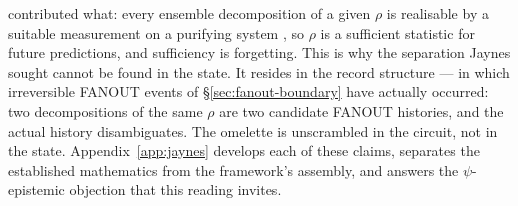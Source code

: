 contributed what: every ensemble decomposition of a given $\rho$ is
realisable by a suitable measurement on a purifying system
\autocite{schrodinger1936probability,hughston1993ensemble}, so $\rho$
is a sufficient statistic for future predictions, and sufficiency is
forgetting. This is why the separation Jaynes sought cannot be found
in the state. It resides in the record structure --- in which
irreversible FANOUT events of \S\ref{sec:fanout-boundary} have actually
occurred: two decompositions of the same $\rho$ are two candidate
FANOUT histories, and the actual history disambiguates. The omelette
is unscrambled in the circuit, not in the state.
Appendix~\ref{app:jaynes} develops each of these claims, separates the
established mathematics from the framework's assembly, and answers the
$\psi$-epistemic objection that this reading invites.
